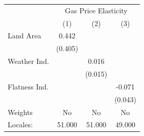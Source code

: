 {
\def\sym#1{\ifmmode^{#1}\else\(^{#1}\)\fi}
\begin{tabular}{l*{3}{c}}
\hline\hline
            &\multicolumn{3}{c}{Gas Price Elasticity}                         \\
            &\multicolumn{1}{c}{(1)}         &\multicolumn{1}{c}{(2)}         &\multicolumn{1}{c}{(3)}         \\
\hline
Land Area   &       0.442         &                     &                     \\
            &     (0.405)         &                     &                     \\
[1em]
Weather Ind.&                     &       0.016         &                     \\
            &                     &     (0.015)         &                     \\
[1em]
Flatness Ind.&                     &                     &      -0.071         \\
            &                     &                     &     (0.043)         \\
\hline
Weights     &          No         &          No         &          No         \\
Locales:    &      51.000         &      51.000         &      49.000         \\
\hline\hline
\end{tabular}
}
